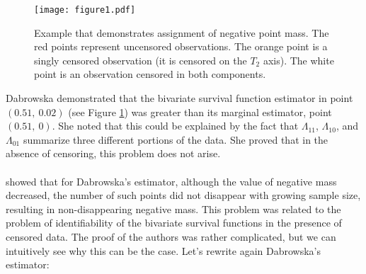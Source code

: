 \documentclass[]{article}
\begin{document}
%
%
%
%
%


\begin{figure}[!h]
\texttt{[image: figure1.pdf]}
\caption{Example that demonstrates assignment of negative point mass. The red points represent uncensored observations. The orange point is a singly censored observation (it is censored on the $T_2$ axis). The white point is an observation censored in both components.}
\label{fig:bubbles}
\end{figure}

Dabrowska demonstrated that the bivariate survival function estimator in point $(0.51,~0.02)$ (see Figure \ref{fig:bubbles}) was greater than its marginal estimator, point $(0.51,~0)$. She noted that this could be explained by the fact that $\Lambda_{11}$, $\Lambda_{10}$, and $\Lambda_{01}$ summarize three different portions of the data. She proved that in the absence of censoring, this problem does not arise.\\
~\\
\cite{pruitt1991negative} showed that for Dabrowska's estimator, although the value of negative mass decreased, the number of such points did not disappear with growing sample size, resulting in non-disappearing negative mass. This problem was related to the problem of identifiability of the bivariate survival functions in the presence of censored data. The proof of the authors was rather complicated, but we can intuitively see why this can be the case. Let's rewrite again Dabrowska's estimator:
\end{document}
